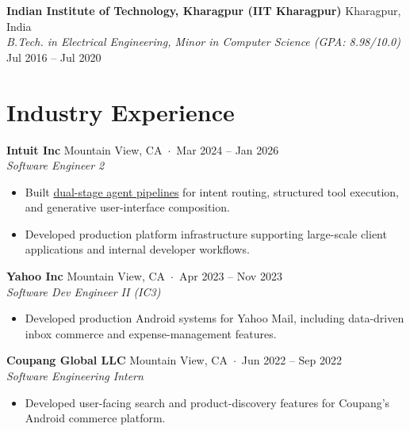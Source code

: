 \documentclass[10pt,letterpaper]{article}
\begin{document}
\medskip

\noindent
\textbf{Indian Institute of Technology, Kharagpur (IIT Kharagpur)}
\hfill Kharagpur, India
\\
\textit{B.Tech. in Electrical Engineering,
Minor in Computer Science (GPA: 8.98/10.0)}
\hfill Jul 2016 -- Jul 2020


\section*{Industry Experience}

\noindent
\textbf{Intuit Inc}
\hfill Mountain View, CA
\,$\cdot$\,
Mar 2024 -- Jan 2026
\\
\textit{Software Engineer 2}

\begin{itemize}

    \item Built
    \href{https://satyam-aw.github.io/projects/intuit_generative_ui/}
    {dual-stage agent pipelines}
    for intent routing, structured tool execution,
    and generative user-interface composition.

    \item Developed production platform infrastructure supporting
    large-scale client applications and internal developer workflows.

\end{itemize}

\noindent
\textbf{Yahoo Inc}
\hfill Mountain View, CA
\,$\cdot$\,
Apr 2023 -- Nov 2023
\\
\textit{Software Dev Engineer II (IC3)}

\begin{itemize}

    \item Developed production Android systems for Yahoo Mail,
    including data-driven inbox commerce and expense-management features.

\end{itemize}

\noindent
\textbf{Coupang Global LLC}
\hfill Mountain View, CA
\,$\cdot$\,
Jun 2022 -- Sep 2022
\\
\textit{Software Engineering Intern}

\begin{itemize}

    \item Developed user-facing search and product-discovery features
    for Coupang's Android commerce platform.

\end{itemize}
\end{document}
